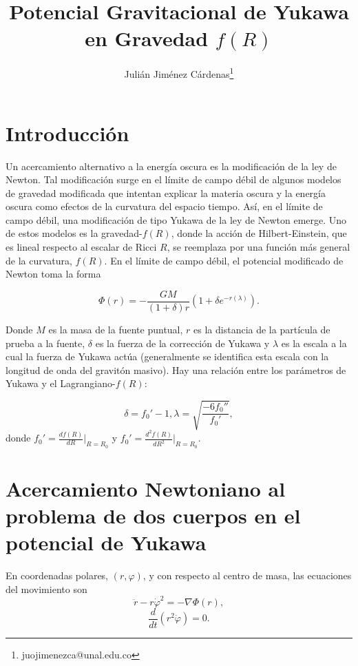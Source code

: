 \documentclass{article}
\begin{document}
	
	\title{Potencial Gravitacional de Yukawa en Gravedad $f(R)$}
	\author{Julián Jiménez Cárdenas\thanks{juojimenezca@unal.edu.co}}
	\date{}
	
	\maketitle
	
	\section{Introducción}

Un acercamiento alternativo a la energía oscura es la modificación de la ley de Newton. Tal modificación surge en el límite de campo débil de algunos modelos de gravedad modificada que intentan explicar la materia oscura y la energía oscura como efectos de la curvatura del espacio tiempo. Así, en el límite de campo débil, una modificación de tipo Yukawa de la ley de Newton emerge. Uno de estos modelos es la gravedad-$f(R)$, donde la acción de Hilbert-Einstein, que es lineal respecto al escalar de Ricci $R$, se reemplaza por una función más general de la curvatura, $f(R)$. En el límite de campo débil, el potencial modificado de Newton toma la forma

\begin{equation}\label{yukawaPotential}
\Phi(r)=-\frac{GM}{(1+\delta)r}(1+\delta e^{-r(\lambda)}).
\end{equation}

Donde $M$ es la masa de la fuente puntual, $r$ es la distancia de la partícula de prueba a la fuente, $\delta$ es la fuerza de la corrección de Yukawa y $\lambda$ es la escala a la cual la fuerza de Yukawa actúa (generalmente se identifica esta escala con la longitud de onda del gravitón masivo). Hay una relación entre los parámetros de Yukawa y el Lagrangiano-$f(R)$:

\begin{equation}
	\delta=f_0'-1, \lambda=\sqrt{\frac{-6f_0''}{f_0'}},
\end{equation} 
donde $f_0'=\frac{df(R)}{dR}\Big|_{R=R_0}$ y $f_0'=\frac{d^2f(R)}{dR^2}\Big|_{R=R_0}.$

\section{Acercamiento Newtoniano al problema de dos cuerpos en el potencial de Yukawa}
En coordenadas polares, $(r,\varphi)$, y con respecto al centro de masa, las ecuaciones del movimiento son
\begin{equation}
\ddot{r}-r\dot{\varphi}^2 = -\nabla \Phi(r),
\end{equation}
\begin{equation}\label{angularConservation}
	\frac{d}{dt}(r^2\dot{\varphi})=0.
\end{equation}
\end{document}
